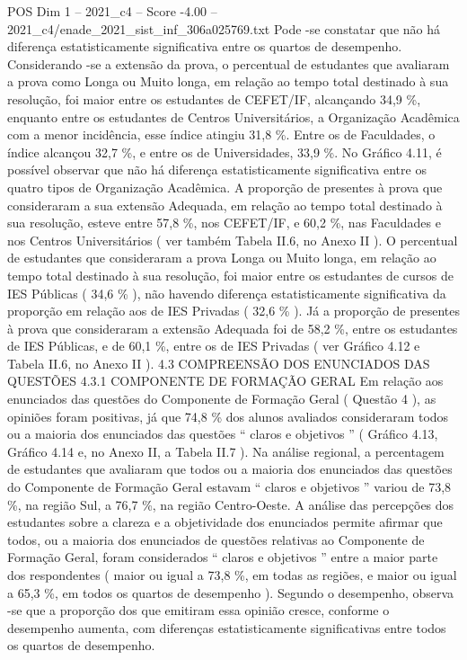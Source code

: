 \begin{textsample}{POS Dim 1 – 2021\_c4 – Score -4.00 – 2021\_c4/enade\_2021\_sist\_inf\_306a025769.txt}
Pode -se constatar que não há diferença estatisticamente significativa entre os quartos de desempenho.
Considerando -se a extensão da prova, o percentual de estudantes que avaliaram a prova como Longa ou Muito longa, em relação ao tempo total destinado à sua resolução, foi maior entre os estudantes de CEFET/IF, alcançando 34,9 \%, enquanto entre os estudantes de Centros Universitários, a Organização Acadêmica com a menor incidência, esse índice atingiu 31,8 \%.
Entre os de Faculdades, o índice alcançou 32,7 \%, e entre os de Universidades, 33,9 \%.
No Gráfico 4.11, é possível observar que não há diferença estatisticamente significativa entre os quatro tipos de Organização Acadêmica.
A proporção de presentes à prova que consideraram a sua extensão Adequada, em relação ao tempo total destinado à sua resolução, esteve entre 57,8 \%, nos CEFET/IF, e 60,2 \%, nas Faculdades e nos Centros Universitários ( ver também Tabela II.6, no Anexo II ).
O percentual de estudantes que consideraram a prova Longa ou Muito longa, em relação ao tempo total destinado à sua resolução, foi maior entre os estudantes de cursos de IES Públicas ( 34,6 \% ), não havendo diferença estatisticamente significativa da proporção em relação aos de IES Privadas ( 32,6 \% ).
Já a proporção de presentes à prova que consideraram a extensão Adequada foi de 58,2 \%, entre os estudantes de IES Públicas, e de 60,1 \%, entre os de IES Privadas ( ver Gráfico 4.12 e Tabela II.6, no Anexo II ). 4.3 COMPREENSÃO DOS ENUNCIADOS DAS QUESTÕES 4.3.1 COMPONENTE DE FORMAÇÃO GERAL Em relação aos enunciados das questões do Componente de Formação Geral ( Questão 4 ), as opiniões foram positivas, já que 74,8 \% dos alunos avaliados consideraram todos ou a maioria dos enunciados das questões “ claros e objetivos ” ( Gráfico 4.13, Gráfico 4.14 e, no Anexo II, a Tabela II.7 ).
Na análise regional, a percentagem de estudantes que avaliaram que todos ou a maioria dos enunciados das questões do Componente de Formação Geral estavam “ claros e objetivos ” variou de 73,8 \%, na região Sul, a 76,7 \%, na região Centro-Oeste.
A análise das percepções dos estudantes sobre a clareza e a objetividade dos enunciados permite afirmar que todos, ou a maioria dos enunciados de questões relativas ao Componente de Formação Geral, foram considerados “ claros e objetivos ” entre a maior parte dos respondentes ( maior ou igual a 73,8 \%, em todas as regiões, e maior ou igual a 65,3 \%, em todos os quartos de desempenho ).
Segundo o desempenho, observa -se que a proporção dos que emitiram essa opinião cresce, conforme o desempenho aumenta, com diferenças estatisticamente significativas entre todos os quartos de desempenho.

\end{textsample}
